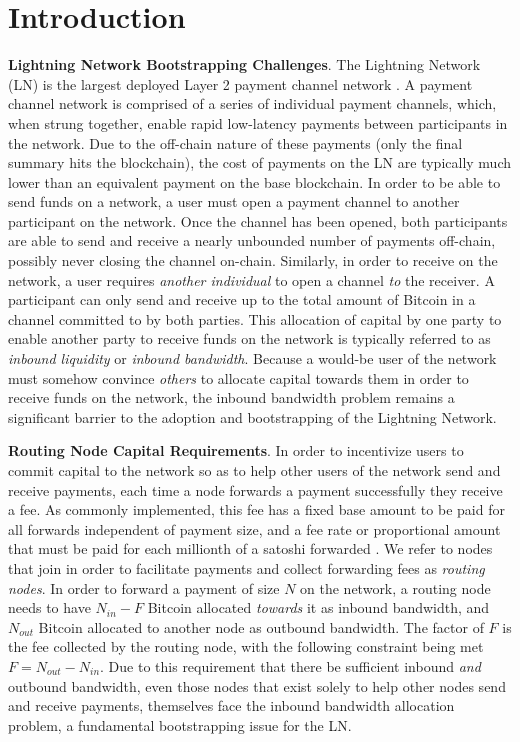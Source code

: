 \documentclass[10pt,a4paper]{article}
\theoremstyle{definition}
\begin{document}
\tableofcontents

\vfill

\section{Introduction}

\textbf{Lightning Network Bootstrapping Challenges}. The Lightning Network (LN)
is the largest deployed Layer 2 payment channel network \cite{lnpaper}.  A
payment channel network is comprised of a series of individual payment
channels, which, when strung together, enable rapid low-latency payments
between participants in the network. Due to the off-chain nature of these
payments (only the final summary hits the blockchain), the cost of payments on
the LN are typically much lower than an equivalent payment on the base
blockchain. In order to be able to send funds on a network, a user must open a
payment channel to another participant on the network. Once the channel has
been opened, both participants are able to send and receive a nearly unbounded
number of payments off-chain, possibly never closing the channel on-chain.
Similarly, in order to receive on the network, a user requires \emph{another
individual} to open a channel \emph{to} the receiver. A participant can only
send and receive up to the total amount of Bitcoin in a channel committed to by
both parties. This allocation of capital by one party to enable another party
to receive funds on the network is typically referred to as \emph{inbound
liquidity} or \emph{inbound bandwidth}.  Because a would-be user of the network
must somehow convince \emph{others} to allocate capital towards them in order
to receive funds on the network, the inbound bandwidth problem remains a
significant barrier to the adoption and bootstrapping of the Lightning Network.

\textbf{Routing Node Capital Requirements}.  In order to incentivize users to
commit capital to the network so as to help other users of the network send and
receive payments, each time a node forwards a payment successfully they receive
a fee. As commonly implemented, this fee has a fixed base amount to be paid for
all forwards independent of payment size, and a fee rate or proportional amount
that must be paid for each millionth of a satoshi forwarded \cite{bolt7}. We
refer to nodes that join in order to facilitate payments and collect forwarding
fees as \emph{routing nodes}. In order to forward a payment of size $N$ on the
network, a routing node needs to have $N_{in} - F$ Bitcoin allocated
\emph{towards} it as inbound bandwidth, and $N_{out}$ Bitcoin allocated to
another node as outbound bandwidth. The factor of $F$ is the fee collected by
the routing node, with the following constraint being met $F = N_{out} -
N_{in}$. Due to this requirement that there be sufficient inbound \emph{and}
outbound bandwidth, even those nodes that exist solely to help other nodes send
and receive payments, themselves face the inbound bandwidth allocation problem,
a fundamental bootstrapping issue for the LN.
\end{document}
